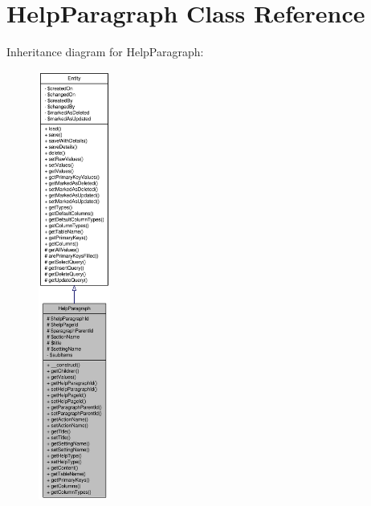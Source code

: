 \hypertarget{classHelpParagraph}{
\section{HelpParagraph Class Reference}
\label{classHelpParagraph}
}


Inheritance diagram for HelpParagraph:\nopagebreak
\begin{figure}[H]
\begin{center}
\leavevmode
\includegraphics[height=400pt]{classHelpParagraph__inherit__graph}
\end{center}
\end{figure}


